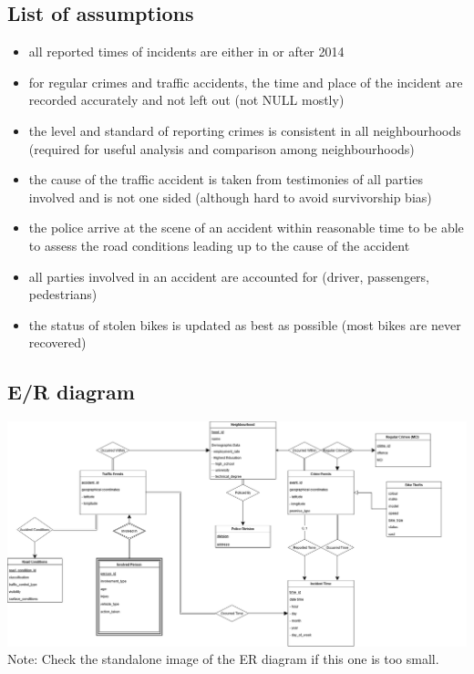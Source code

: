 \documentclass[12pt, a4paper]{article}
\begin{document}
\subsection*{List of assumptions}
\begin{itemize}
    \item all reported times of incidents are either in or after 2014
    \item for regular crimes and traffic accidents, the time and place of the incident are recorded accurately and not left out (not NULL mostly)
    \item the level and standard of reporting crimes is consistent in all neighbourhoods (required for useful analysis and comparison among neighbourhoods)
    \item the cause of the traffic accident is taken from testimonies of all parties involved and is not one sided (although hard to avoid survivorship bias)
    \item the police arrive at the scene of an accident within reasonable time to be able to assess the road conditions leading up to the cause of the accident
    \item all parties involved in an accident are accounted for (driver, passengers, pedestrians)
    \item the status of stolen bikes is updated as best as possible (most bikes are never recovered)
\end{itemize}
\subsection*{E/R diagram}
\includegraphics[scale=0.3]{ER Diagram.png}
Note: Check the standalone image of the ER diagram if this one is too small.
\end{document}
